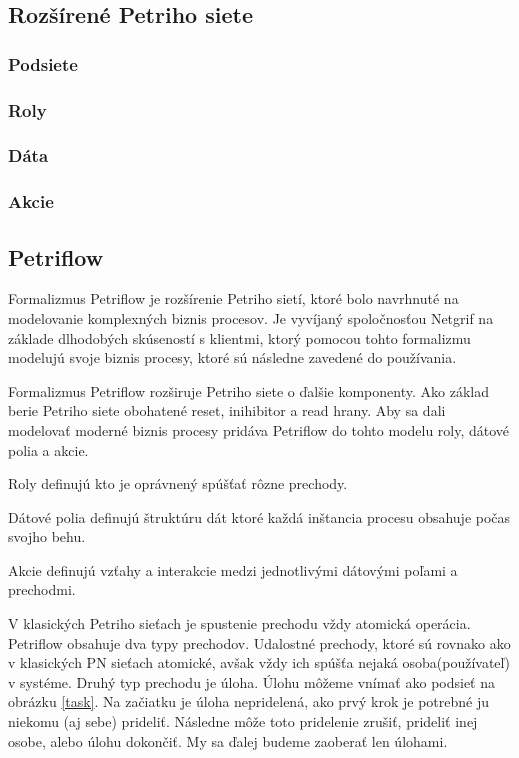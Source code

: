 \subsection{Rozšírené Petriho siete}
\subsubsection{Podsiete}
\subsubsection{Roly}
\subsubsection{Dáta}
\subsubsection{Akcie}

\subsection{Petriflow}

Formalizmus Petriflow je rozšírenie Petriho sietí, ktoré bolo navrhnuté na modelovanie komplexných biznis procesov. Je vyvíjaný spoločnosťou Netgrif na základe dlhodobých skúseností s klientmi, ktorý pomocou tohto formalizmu modelujú svoje biznis procesy, ktoré sú následne zavedené do používania.

Formalizmus Petriflow rozširuje Petriho siete o ďalšie komponenty. Ako základ berie Petriho siete obohatené reset, inihibitor a read hrany. Aby sa dali modelovať moderné biznis procesy pridáva Petriflow do tohto modelu roly, dátové polia a akcie.

Roly definujú kto je oprávnený spúšťať rôzne prechody.

Dátové polia definujú štruktúru dát ktoré každá inštancia procesu obsahuje počas svojho behu.

Akcie definujú vzťahy a interakcie medzi jednotlivými dátovými poľami a prechodmi.

V klasických Petriho sieťach je spustenie prechodu vždy atomická operácia. Petriflow obsahuje dva typy prechodov. Udalostné prechody, ktoré sú rovnako  ako v klasických PN sieťach atomické, avšak vždy ich spúšťa nejaká osoba(používateľ) v systéme. Druhý typ prechodu je úloha. Úlohu môžeme vnímať ako podsieť na obrázku \ref{task}. Na začiatku je úloha nepridelená, ako prvý krok je potrebné ju niekomu (aj sebe) prideliť. Následne môže toto pridelenie zrušiť, prideliť inej osobe, alebo úlohu dokončiť. My sa ďalej budeme zaoberať len úlohami.

